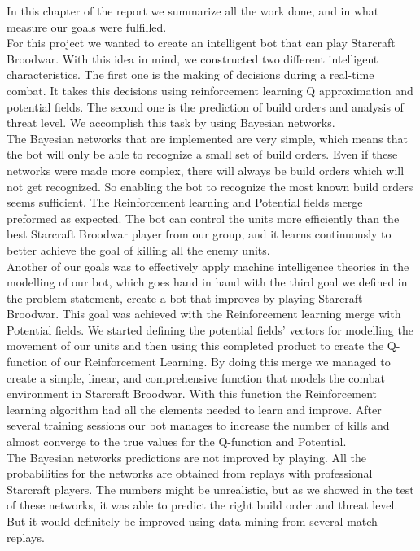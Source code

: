 In this chapter of the report we summarize all the work done, and in what measure our goals were fulfilled. \\

For this project we wanted to create an intelligent bot that can play Starcraft Broodwar. With this idea in mind, we constructed two different intelligent characteristics. The first one is the making of decisions during a real-time combat. It takes this decisions using reinforcement learning Q approximation and potential fields. The second one is the prediction of build orders and analysis of threat level. We accomplish this task by using Bayesian networks. \\

The Bayesian networks that are implemented are very simple, which means that the bot will only be able to recognize a small set of build orders. Even if these networks were made more complex, there will always be build orders which will not get recognized. So enabling the bot to recognize the most known build orders seems sufficient. The Reinforcement learning and Potential fields merge preformed as expected. The bot can control the units more efficiently than the best Starcraft Broodwar player from our group, and it learns continuously to better achieve the goal of killing all the enemy units. \\

Another of our goals was to effectively apply machine intelligence theories in the modelling of our bot, which goes hand in hand with the third goal we defined in the problem statement, create a bot that improves by playing Starcraft Broodwar. This goal was achieved with the Reinforcement learning merge with Potential fields. We started defining the potential fields' vectors for modelling the movement of our units and then using this completed product to create the Q-function of our Reinforcement Learning. By doing this merge we managed to create a simple, linear, and comprehensive function that models the combat environment in Starcraft Broodwar. With this function the Reinforcement learning algorithm had all the elements needed to learn and improve. After several training sessions our bot manages to increase the number of kills and almost converge to the true values for the Q-function and Potential.\\

The Bayesian networks predictions are not improved by playing. All the probabilities for the networks are obtained from replays with professional Starcraft players. The numbers might be unrealistic, but as we showed in the test of these networks, it was able to predict the right build order and threat level. But it would definitely be improved using data mining from several match replays. \\

